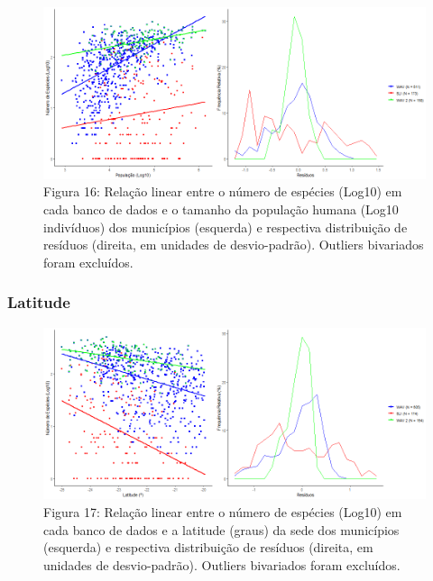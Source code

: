 \begin{figure}[h!]
\centering
\includegraphics[width = 15cm]{Imagens/32333.png}
\\{\scriptsize Figura 16: Relação linear entre o número de espécies (Log10) em cada banco de dados e o tamanho da população humana (Log10 indivíduos) dos municípios (esquerda) e respectiva distribuição de resíduos (direita, em unidades de desvio-padrão). Outliers bivariados foram excluídos.}
\end{figure}

\texto

\subsubsection{Latitude}

 

\begin{figure}[h!]
\centering
\includegraphics[width = 15cm]{Imagens/32433.png}
\\{\scriptsize Figura 17: Relação linear entre o número de espécies (Log10) em cada banco de dados e a latitude (graus) da sede dos municípios (esquerda) e respectiva distribuição de resíduos (direita, em unidades de desvio-padrão). Outliers bivariados foram excluídos.}
\end{figure}

\texto

